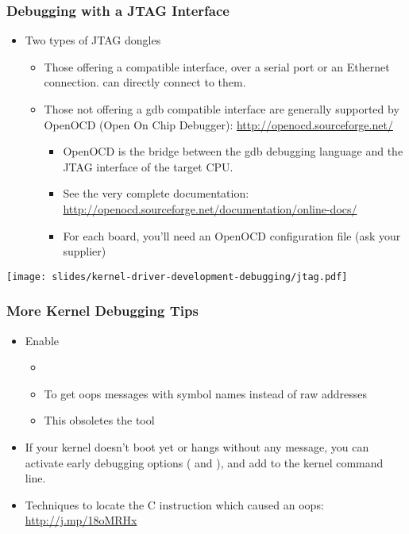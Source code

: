 \begin{frame}
  \frametitle{Debugging with a JTAG Interface}
  \begin{itemize}
  \item Two types of JTAG dongles
    \begin{itemize}
    \item Those offering a  compatible interface, over a
      serial port or an Ethernet connection.  can directly
      connect to them.
    \item Those not offering a gdb compatible interface are generally
      supported by OpenOCD (Open On Chip Debugger):
      \url{http://openocd.sourceforge.net/}
      \begin{itemize}
      \item OpenOCD is the bridge between the gdb debugging language
        and the JTAG interface of the target CPU.
      \item See the very complete documentation:
        \url{http://openocd.sourceforge.net/documentation/online-docs/}
      \item For each board, you'll need an OpenOCD configuration file
        (ask your supplier)
      \end{itemize}
    \end{itemize}
  \end{itemize}
   \begin{center}
     \texttt{[image: slides/kernel-driver-development-debugging/jtag.pdf]}
   \end{center}
\end{frame}

\begin{frame}
  \frametitle{More Kernel Debugging Tips}
  \begin{itemize}
  \item Enable 
    \begin{itemize}
    \item {}
    \item To get oops messages with symbol names instead of raw addresses
    \item This obsoletes the  tool
    \end{itemize}
  \item If your kernel doesn't boot yet or hangs without any message,
    you can activate early debugging options ( and
    ), and add  to the kernel
    command line.
  \item Techniques to locate the C instruction which caused an oops:
    \url{http://j.mp/18oMRHx}
  \end{itemize}
\end{frame}

